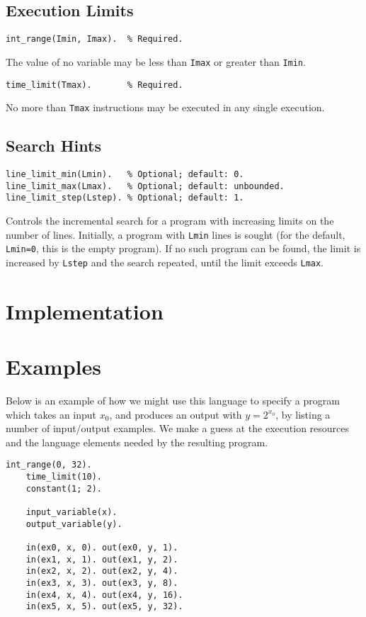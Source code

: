\documentclass[a4paper,twoside,notitlepage]{report}
\newcommand{\ttt}{\texttt}
\begin{document}
\subsection{Execution Limits}
\begin{Verbatim}[samepage=true]
int_range(Imin, Imax).  % Required.
\end{Verbatim}
The value of no variable may be less than \ttt{Imax} or greater than 
\ttt{Imin}.

\begin{Verbatim}[samepage=true]
time_limit(Tmax).       % Required.
\end{Verbatim}
No more than \ttt{Tmax} instructions may be executed in any single execution.

\subsection{Search Hints}
\begin{Verbatim}[samepage=true]
line_limit_min(Lmin).   % Optional; default: 0.
line_limit_max(Lmax).   % Optional; default: unbounded.
line_limit_step(Lstep). % Optional; default: 1.
\end{Verbatim}
Controls the incremental search for a program with increasing limits on 
the number of lines. Initially, a program with \ttt{Lmin} lines is sought 
(for the default, \verb|Lmin=0|, this is the empty program). If no such 
program can be found, the limit is increased by \ttt{Lstep} and the search 
repeated, until the limit exceeds \ttt{Lmax}.

\section{Implementation}

\section{Examples}
Below is an example of how we might use this language to specify a program 
which takes an input $x_0$, and produces an output with $y = 2^{x_0}$, by 
listing a number of input/output examples. We make a guess at the 
execution resources and the language elements needed by the resulting 
program.

\begin{Verbatim}[samepage=true]
    int_range(0, 32).
    time_limit(10).
    constant(1; 2).

    input_variable(x).
    output_variable(y).

    in(ex0, x, 0). out(ex0, y, 1).
    in(ex1, x, 1). out(ex1, y, 2).
    in(ex2, x, 2). out(ex2, y, 4).
    in(ex3, x, 3). out(ex3, y, 8).
    in(ex4, x, 4). out(ex4, y, 16).
    in(ex5, x, 5). out(ex5, y, 32).
\end{Verbatim}
\end{document}
